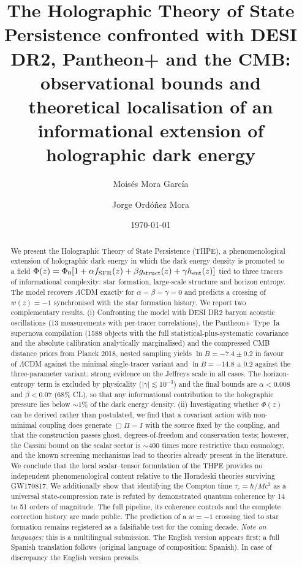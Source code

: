 \documentclass[aps,prd,twocolumn,superscriptaddress,nofootinbib,floatfix]{revtex4-2}
\newcommand{\LCDM}{\ensuremath{\Lambda}CDM}
\begin{document}
\title{The Holographic Theory of State Persistence confronted with
DESI DR2, Pantheon+ and the CMB: observational bounds and theoretical
localisation of an informational extension of holographic dark energy}

\author{Mois\'es Mora Garc\'ia}
\author{Jorge Ord\'o\~nez Mora}

\date{\today}

\begin{abstract}
We present the Holographic Theory of State Persistence (THPE), a
phenomenological extension of holographic dark energy in which the dark
energy density is promoted to a field
$\Phi(z)=\Phi_0[1+\alpha f_{\rm SFR}(z)+\beta g_{\rm struct}(z)+\gamma
h_{\rm ent}(z)]$ tied to three tracers of informational complexity:
star formation, large-scale structure and horizon entropy. The model
recovers \LCDM{} exactly for $\alpha=\beta=\gamma=0$ and predicts a
crossing of $w(z)=-1$ synchronised with the star formation history.
We report two complementary results. (i) Confronting the model with
DESI DR2 baryon acoustic oscillations (13 measurements with per-tracer
correlations), the Pantheon+ Type~Ia supernova compilation (1588
objects with the full statistical-plus-systematic covariance and the
absolute calibration analytically marginalised) and the compressed CMB
distance priors from Planck 2018, nested sampling yields
$\ln B=-7.4\pm0.2$ in favour of \LCDM{} against the minimal
single-tracer variant and $\ln B=-14.8\pm0.2$ against the
three-parameter variant: strong evidence on the Jeffreys scale in all
cases. The horizon-entropy term is excluded by physicality
($|\gamma|\lesssim10^{-3}$) and the final bounds are $\alpha<0.008$ and
$\beta<0.07$ (68\% CL), so that any informational contribution to the
holographic pressure lies below $\sim1\%$ of the dark energy density.
(ii) Investigating whether $\Phi(z)$ can be derived rather than
postulated, we find that a covariant action with non-minimal coupling
does generate $\Box\Pi=I$ with the source fixed by the coupling, and
that the construction passes ghost, degrees-of-freedom and
conservation tests; however, the Cassini bound on the scalar sector is
$\sim400$ times more restrictive than cosmology, and the known
screening mechanisms lead to theories already present in the
literature. We conclude that the local scalar--tensor formulation of
the THPE provides no independent phenomenological content relative to
the Horndeski theories surviving GW170817. We additionally show that
identifying the Compton time $\tau_c=\hbar/Mc^2$ as a universal
state-compression rate is refuted by demonstrated quantum coherence by
14 to 51 orders of magnitude. The full pipeline, its coherence
controls and the complete correction history are made public. The
prediction of a $w=-1$ crossing tied to star formation remains
registered as a falsifiable test for the coming decade.
\vskip4pt
\noindent\emph{Note on languages:} this is a multilingual submission.
The English version appears first; a full Spanish translation follows
(original language of composition: Spanish). In case of discrepancy the
English version prevails.
\end{abstract}
\end{document}
